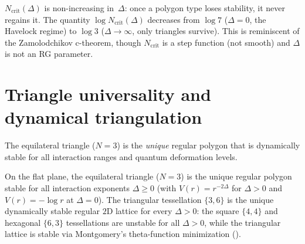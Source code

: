 \begin{corollary}
\label{cor:c-theorem}
$N_{\mathrm{crit}}(\Delta)$ is non-increasing in~$\Delta$: once a
polygon type loses stability, it never regains it.
The quantity $\log N_{\mathrm{crit}}(\Delta)$ decreases from
$\log 7$ ($\Delta = 0$, the Havelock regime) to
$\log 3$ ($\Delta \to \infty$, only triangles survive).
This is reminiscent of the Zamolodchikov c-theorem,
though $N_{\mathrm{crit}}$ is a step function (not smooth)
and $\Delta$ is not an RG parameter.
\end{corollary}

\section{Triangle universality and dynamical triangulation}
\label{sec:triangle}

The equilateral triangle ($N = 3$) is the \emph{unique} regular
polygon that is dynamically stable for all interaction ranges
and quantum deformation levels.

\begin{theorem}
\label{thm:triangle-universality}
On the flat plane, the equilateral triangle ($N = 3$) is the unique
regular polygon stable for all interaction exponents $\Delta \ge 0$
(with $V(r) = r^{-2\Delta}$ for $\Delta > 0$ and $V(r) = -\log r$
at $\Delta = 0$).
The triangular tessellation $\{3,6\}$ is the unique dynamically
stable regular $2$D lattice for every $\Delta > 0$:
the square $\{4,4\}$ and hexagonal $\{6,3\}$ tessellations are
unstable for all $\Delta > 0$, while the triangular lattice is
stable via Montgomery's theta-function minimization
(\citealt{Montgomery1988}).
\end{theorem}

